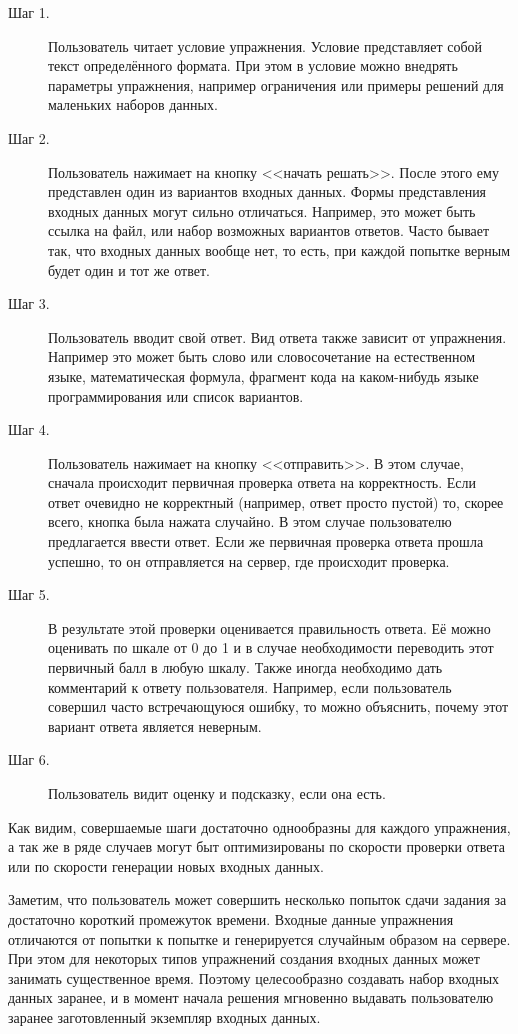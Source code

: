 \documentclass{matmex-diploma-custom}
\begin{document}
\begin{description}
\item[Шаг 1.] Пользователь читает условие упражнения. Условие
  представляет собой текст определённого формата. При этом в условие
  можно внедрять параметры упражнения, например ограничения или
  примеры решений для маленьких наборов данных.

\item[Шаг 2.] Пользователь нажимает на кнопку <<начать решать>>.
  После этого ему представлен один из вариантов входных данных. Формы
  представления входных данных могут сильно отличаться. Например, это
  может быть ссылка на файл, или набор возможных вариантов
  ответов. Часто бывает так, что входных данных вообще нет, то есть,
  при каждой попытке верным будет один и тот же ответ.
\item[Шаг 3.] Пользователь вводит свой ответ. Вид ответа также зависит
  от упражнения. Например это может быть слово или словосочетание на
  естественном языке, математическая формула, фрагмент кода на
  каком-нибудь языке программирования или список вариантов.
\item[Шаг 4.] Пользователь нажимает на кнопку <<отправить>>. В этом
  случае, сначала происходит первичная проверка ответа на
  корректность. Если ответ очевидно не корректный (например, ответ
  просто пустой) то, скорее всего, кнопка была нажата случайно. В этом
  случае пользователю предлагается ввести ответ. Если же первичная
  проверка ответа прошла успешно, то он отправляется на сервер, где
  происходит проверка.
\item[Шаг 5.] В результате этой проверки оценивается правильность
  ответа. Её можно оценивать по шкале от 0 до 1 и в случае
  необходимости переводить этот первичный балл в любую шкалу. Также
  иногда необходимо дать комментарий к ответу пользователя. Например,
  если пользователь совершил часто встречающуюся ошибку, то можно
  объяснить, почему этот вариант ответа является неверным.
\item[Шаг 6.] Пользователь видит оценку и подсказку, если она есть.
\end{description}

Как видим, совершаемые шаги достаточно однообразны для каждого
упражнения, а так же в ряде случаев могут быт оптимизированы по
скорости проверки ответа или по скорости генерации новых входных
данных.


Заметим, что пользователь может совершить несколько попыток сдачи
задания за достаточно короткий промежуток времени. Входные данные
упражнения отличаются от попытки к попытке и генерируется случайным
образом на сервере. При этом для некоторых типов упражнений создания
входных данных может занимать существенное время. Поэтому
целесообразно создавать набор входных данных заранее, и в момент
начала решения мгновенно выдавать пользователю заранее заготовленный
экземпляр входных данных.
\end{document}
